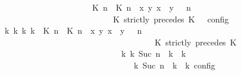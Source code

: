 \begin{isabellebody}
\ \ \ \ \ \ \isamarkupfalse%
\ {\isacharminus}\isanewline
\ \ \ \ \ \ \ \ \isamarkupfalse%
\ {\isacartoucheopen}{\isasymrho}\ {\isasymin}\ {\isasymlbrakk}\ {\isacharparenleft}{\isacharparenleft}{\isasymlceil}{\isacharhash}\isactrlsup {\isasymle}\ K\ n{\isacharcomma}\ {\isacharhash}\isactrlsup {\isacharless}\ K\ n{\isasymrceil}\ {\isasymin}\ {\isacharparenleft}{\isasymlambda}{\isacharparenleft}x{\isacharcomma}\ y{\isacharparenright}{\isachardot}\ x\ {\isasymle}\ y{\isacharparenright}{\isacharparenright}\ {\isacharhash}\ {\isasymGamma}{\isacharparenright}{\isacharcomma}\ n\isanewline
\ \ \ \ \ \ \ \ \ \ \ \ \ \ \ \ \ \ \ \ \ \ \ \ {\isasymturnstile}\ {\isasymPsi}\ {\isasymtriangleright}\ {\isacharparenleft}{\isacharparenleft}K\ strictly\ precedes\ K\ {\isacharhash}\ {\isasymPhi}{\isacharparenright}\ {\isasymrbrakk}\isactrlsub c\isactrlsub o\isactrlsub n\isactrlsub f\isactrlsub i\isactrlsub g{\isacartoucheclose}\isanewline
\ \ \ \ \ \ \ \ \isamarkupfalse%
\ {\isacartoucheopen}{\isasymexists}{\isasymGamma}\isactrlsub k\ {\isasymPsi}\isactrlsub k\ {\isasymPhi}\isactrlsub k\ k{\isachardot}\ {\isacharparenleft}{\isacharparenleft}{\isacharparenleft}{\isacharparenleft}{\isasymlceil}{\isacharhash}\isactrlsup {\isasymle}\ K\ n{\isacharcomma}\ {\isacharhash}\isactrlsup {\isacharless}\ K\ n{\isasymrceil}\ {\isasymin}\ {\isacharparenleft}{\isasymlambda}{\isacharparenleft}x{\isacharcomma}\ y{\isacharparenright}{\isachardot}\ x\ {\isasymle}\ y{\isacharparenright}{\isacharparenright}\ {\isacharhash}\ {\isasymGamma}{\isacharparenright}{\isacharcomma}\ n\isanewline
\ \ \ \ \ \ \ \ \ \ \ \ \ \ \ \ \ \ \ \ \ \ \ \ \ \ \ \ \ \ \ \ \ \ {\isasymturnstile}\ {\isasymPsi}\ {\isasymtriangleright}\ {\isacharparenleft}{\isacharparenleft}K\ strictly\ precedes\ K\ {\isacharhash}\ {\isasymPhi}{\isacharparenright}{\isacharparenright}\isanewline
\ \ \ \ \ \ \ \ \ \ \ \ \ \ \ \ \ \ \ \ \ \ \ \ \ \ \ \ \ {\isasymhookrightarrow}\isactrlbsup k\isactrlesup \ {\isacharparenleft}{\isasymGamma}\isactrlsub k{\isacharcomma}\ Suc\ n\ {\isasymturnstile}\ {\isasymPsi}\isactrlsub k\ {\isasymtriangleright}\ {\isasymPhi}\isactrlsub k{\isacharparenright}{\isacharparenright}\isanewline
\ \ \ \ \ \ \ \ \ \ \ \ \ \ \ \ \ \ \ \ \ \ \ \ \ \ \ \ {\isasymand}\ {\isacharparenleft}{\isasymrho}\ {\isasymin}\ {\isasymlbrakk}\ {\isasymGamma}\isactrlsub k{\isacharcomma}\ Suc\ n\ {\isasymturnstile}\ {\isasymPsi}\isactrlsub k\ {\isasymtriangleright}\ {\isasymPhi}\isactrlsub k\ {\isasymrbrakk}\isactrlsub c\isactrlsub o\isactrlsub n\isactrlsub f\isactrlsub i\isactrlsub g{\isacharparenright}{\isacartoucheclose}\isanewline

\end{isabellebody}
